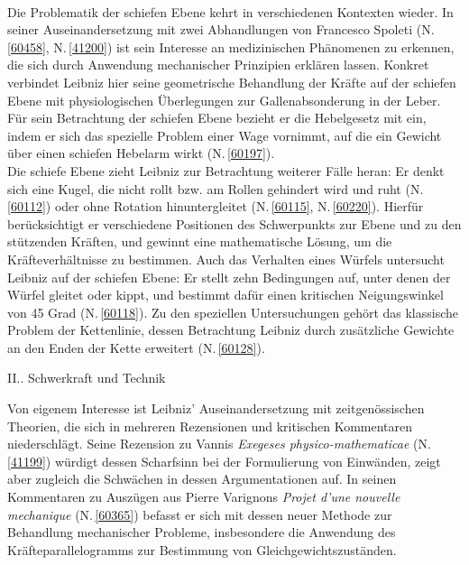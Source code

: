 \\ \indent
Die Problematik der schiefen Ebene kehrt in verschiedenen Kontexten wieder. In seiner Auseinandersetzung mit zwei Abhandlungen von Francesco Spoleti (N.\,\ref{60458}, N.\,\ref{41200}) ist sein Interesse an medizinischen Phänomenen zu erkennen, die sich durch Anwendung mechanischer Prinzipien erklären lassen. Konkret verbindet Leibniz hier seine geometrische Behandlung der Kräfte auf der schiefen Ebene mit physiologischen Überlegungen zur Gallenabsonderung in der Leber. Für sein Betrachtung der schiefen Ebene bezieht er die Hebelgesetz mit ein, indem er sich das spezielle Problem einer Wage vornimmt, auf die ein Gewicht über einen schiefen Hebelarm wirkt (N.\,\ref{60197}).%
\\ \indent
Die schiefe Ebene zieht Leibniz zur Betrachtung weiterer Fälle heran: Er denkt sich eine Kugel, die nicht rollt bzw. am Rollen gehindert wird und ruht (N.\,\ref{60112}) oder ohne Rotation hinuntergleitet (N.\,\ref{60115}, N.\,\ref{60220}). Hierfür berücksichtigt er verschiedene Positionen des Schwerpunkts zur Ebene und zu den stützenden Kräften, und gewinnt eine mathematische Lösung, um die Kräfteverhältnisse zu bestimmen. Auch das Verhalten eines Würfels untersucht Leibniz auf der schiefen Ebene: Er stellt zehn Bedingungen auf, unter denen der Würfel gleitet oder kippt, und bestimmt dafür einen kritischen Neigungswinkel von 45 Grad (N.\,\ref{60118}). Zu den speziellen Untersuchungen gehört das klassische Problem der Kettenlinie, dessen Betrachtung Leibniz durch zusätzliche Gewichte an den Enden der Kette erweitert (N.\,\ref{60128}).%
\par
\vspace{1.0em}
\noindent
II.. Schwerkraft und Technik%
\par \noindent
Von eigenem Interesse ist Leibniz' Auseinandersetzung mit zeitgenössischen Theorien, die sich in mehreren Rezensionen und kritischen Kommentaren niederschlägt. Seine Rezension zu Vannis \textit{Exegeses physico-mathematicae} (N.\,\ref{41199}) würdigt dessen Scharfsinn bei der Formulierung von Einwänden, zeigt aber zugleich die Schwächen in dessen Argumentationen auf. In seinen Kommentaren zu Auszügen aus Pierre Varignons \textit{Projet d'une nouvelle mechanique} (N.\,\ref{60365}) befasst er sich mit dessen neuer Methode zur Behandlung mechanischer Probleme, insbesondere die Anwendung des Kräfteparallelogramms zur Bestimmung von Gleichgewichtszuständen. %
